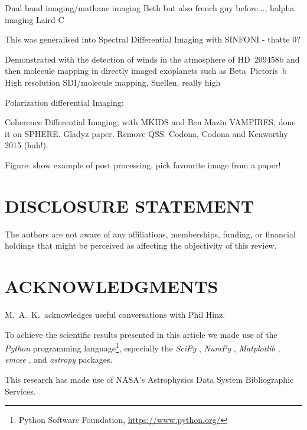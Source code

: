 \documentclass[letterpaper]{ar-1col}
\begin{document}
Dual band imaging/mathane imaging Beth but also french guy before..., halpha imaging Laird C

This was generalised into Spectral Differential Imaging with SINFONI - thatte 0?

Demonstrated with the detection of winds in the atmosphere of HD~209458b \citep{Snellen10} and then molecule mapping in directly imaged exoplanets such as Beta~Pictoris~b \citep{Hoeijmakers18}
High resolution SDI/molecule mapping, Snellen, really high

Polarization differential Imaging:

Coherence Differential Imaging: with MKIDS and Ben Mazin VAMPIRES, done it on SPHERE.
Gladyz paper. Remove QSS. Codona, Codona and Kenworthy 2015 (hah!).

Figure: show example of post processing. pick favourite image from a paper!

\lipsum[2-4]

\section*{DISCLOSURE STATEMENT}
The authors are not aware of any affiliations, memberships, funding, or financial holdings that
might be perceived as affecting the objectivity of this review.

\section*{ACKNOWLEDGMENTS}
M.\ A.\ K.\ acknowledges useful conversations with
Phil Hinz.


To achieve the scientific results presented in this article we made use of the \emph{Python} programming language\footnote{Python Software Foundation, \url{https://www.python.org/}}, especially the \emph{SciPy} \citep{virtanen2020}, \emph{NumPy} \citep{numpy}, \emph{Matplotlib} \citep{Matplotlib}, \emph{emcee} \citep{foreman-mackey2013}, and \emph{astropy} \citep{astropy_1,astropy_2} packages.
%

This research has made use of NASA's Astrophysics Data System Bibliographic Services.





\end{document}
